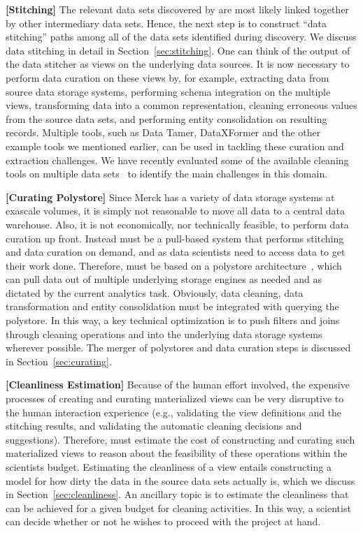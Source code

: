 {\bf[Stitching]} The relevant data sets discovered by \dcv  are most likely  linked together by other intermediary data sets.  Hence, the next step is to construct ``data stitching'' paths among all of the data sets identified during discovery.  We discuss data stitching in detail 
in Section~\ref{sec:stitching}. One can think of the output of the data stitcher as views on the underlying data sources. It is now necessary to perform data curation on these views by, for example, extracting data from source data storage systems, performing schema integration on the multiple views, transforming data into a common representation, cleaning erroneous values from the source data sets, and performing entity consolidation on resulting records. Multiple tools, such as Data Tamer, DataXFormer and the other example tools we mentioned earlier, can be used in tackling these curation and extraction challenges. We have recently evaluated some of the available cleaning tools on multiple data sets~\cite{evaluatioin} to identify the main challenges in this domain.

{\bf[Curating Polystore]} Since Merck has a variety of data storage systems at exascale volumes, it is simply not reasonable to move all data to a  central data warehouse. Also, it is not economically, nor technically feasible, to perform data curation up front.
 Instead \dcv  must be a pull-based  system that performs stitching and data curation on demand, and  as data scientists need to access data to get
their work done.  Therefore, \dcv must be based on a polystore architecture~\cite{DBLP:journals/sigmod/DugganESBHKMMMZ15}, which  can pull data out of multiple underlying storage engines as needed and as dictated by the current analytics task.  Obviously, data cleaning, data transformation and entity consolidation must be integrated with querying the polystore.  In this way, a key technical optimization is to push filters and joins through cleaning operations and into the underlying data storage systems wherever possible.  The
merger of polystores and data curation steps is discussed in Section~\ref{sec:curating}.

{\bf[Cleanliness Estimation]}  Because of the human effort involved, the expensive processes of creating and curating materialized views  can be very disruptive to the human interaction experience (e.g., validating the view definitions and the stitching results, and validating the automatic cleaning decisions and suggestions).  Therefore, \dcv must estimate the cost of constructing and curating such materialized views  to reason about the feasibility of these operations within the scientists budget.  Estimating the cleanliness of a view  entails constructing a model for how dirty the data in the source data sets actually is, which we discuss in Section~\ref{sec:cleanliness}. An ancillary topic is to estimate the cleanliness that can be achieved for a given budget for cleaning activities.  In this way, a scientist can decide
whether or not he wishes to proceed with the project at hand.

